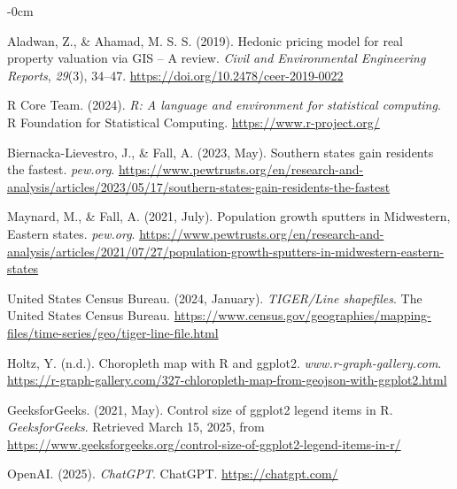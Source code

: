 \documentclass[journal,article,submit,pdftex,moreauthors]{Definitions/mdpi}
\begin{document}
\begin{adjustwidth}{-\extralength}{0cm}
\begin{thebibliography}{99}
Aladwan, Z., \& Ahamad, M. S. S. (2019). Hedonic pricing model for real property valuation via GIS – A review. \textit{Civil and Environmental Engineering Reports}, \textit{29}(3), 34–47. \url{https://doi.org/10.2478/ceer-2019-0022}

R Core Team. (2024). \textit{R: A language and environment for statistical computing}. R Foundation for Statistical Computing. \url{https://www.r-project.org/}

Biernacka-Lievestro, J., \& Fall, A. (2023, May). Southern states gain residents the fastest. \textit{pew.org}. \url{https://www.pewtrusts.org/en/research-and-analysis/articles/2023/05/17/southern-states-gain-residents-the-fastest}

Maynard, M., \& Fall, A. (2021, July). Population growth sputters in Midwestern, Eastern states. \textit{pew.org}. \url{https://www.pewtrusts.org/en/research-and-analysis/articles/2021/07/27/population-growth-sputters-in-midwestern-eastern-states}

United States Census Bureau. (2024, January). \textit{TIGER/Line shapefiles}. The United States Census Bureau. \url{https://www.census.gov/geographies/mapping-files/time-series/geo/tiger-line-file.html}

Holtz, Y. (n.d.). Choropleth map with R and ggplot2. \textit{www.r-graph-gallery.com}. \url{https://r-graph-gallery.com/327-chloropleth-map-from-geojson-with-ggplot2.html}

GeeksforGeeks. (2021, May). Control size of ggplot2 legend items in R. \textit{GeeksforGeeks}. Retrieved March 15, 2025, from \url{https://www.geeksforgeeks.org/control-size-of-ggplot2-legend-items-in-r/}

OpenAI. (2025). \textit{ChatGPT}. ChatGPT. \url{https://chatgpt.com/}


\end{thebibliography}

\end{adjustwidth}
\end{document}
